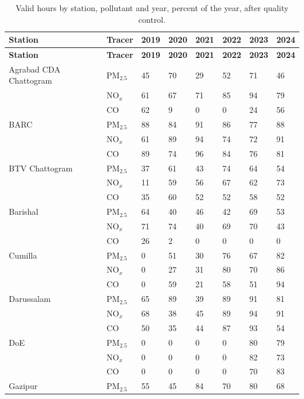 \begingroup\footnotesize
\begin{longtable}{L{3.4cm} L{1.2cm} C{1.0cm} C{1.0cm} C{1.0cm} C{1.0cm} C{1.0cm} C{1.0cm}}
\caption{Valid hours by station, pollutant and year, percent of the year, after quality control.}\label{tab:s-coverage-year}\\
\toprule
\textbf{Station} & \textbf{Tracer} & \textbf{2019} & \textbf{2020} & \textbf{2021} & \textbf{2022} & \textbf{2023} & \textbf{2024} \\
\midrule\endfirsthead
\toprule
\textbf{Station} & \textbf{Tracer} & \textbf{2019} & \textbf{2020} & \textbf{2021} & \textbf{2022} & \textbf{2023} & \textbf{2024} \\
\midrule\endhead
\bottomrule\endfoot
Agrabad CDA Chattogram & PM$_{2.5}$ & 45 & 70 & 29 & 52 & 71 & 46 \\
 & NO$_x$ & 61 & 67 & 71 & 85 & 94 & 79 \\
 & CO & 62 & 9 & 0 & 0 & 24 & 56 \\
BARC & PM$_{2.5}$ & 88 & 84 & 91 & 86 & 77 & 88 \\
 & NO$_x$ & 61 & 89 & 94 & 74 & 72 & 91 \\
 & CO & 89 & 74 & 96 & 84 & 76 & 81 \\
BTV Chattogram & PM$_{2.5}$ & 37 & 61 & 43 & 74 & 64 & 54 \\
 & NO$_x$ & 11 & 59 & 56 & 67 & 62 & 73 \\
 & CO & 35 & 60 & 52 & 52 & 58 & 52 \\
Barishal & PM$_{2.5}$ & 64 & 40 & 46 & 42 & 69 & 53 \\
 & NO$_x$ & 71 & 74 & 40 & 69 & 70 & 43 \\
 & CO & 26 & 2 & 0 & 0 & 0 & 0 \\
Cumilla & PM$_{2.5}$ & 0 & 51 & 30 & 76 & 67 & 82 \\
 & NO$_x$ & 0 & 27 & 31 & 80 & 70 & 86 \\
 & CO & 0 & 59 & 21 & 58 & 51 & 94 \\
Darussalam & PM$_{2.5}$ & 65 & 89 & 39 & 89 & 91 & 81 \\
 & NO$_x$ & 68 & 38 & 45 & 89 & 94 & 91 \\
 & CO & 50 & 35 & 44 & 87 & 93 & 54 \\
DoE & PM$_{2.5}$ & 0 & 0 & 0 & 0 & 80 & 79 \\
 & NO$_x$ & 0 & 0 & 0 & 0 & 82 & 73 \\
 & CO & 0 & 0 & 0 & 0 & 70 & 83 \\
Gazipur & PM$_{2.5}$ & 55 & 45 & 84 & 70 & 80 & 68 \\

\end{longtable}
